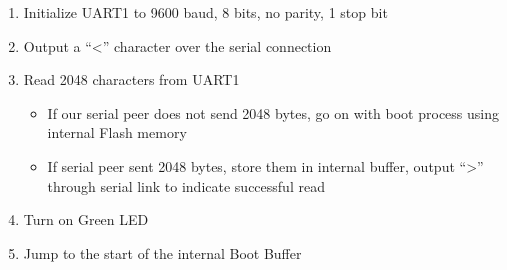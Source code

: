 \documentclass[conference]{IEEEtran}
\newcommand{\nota}[1]{}
\begin{document}
\nota{\begin{enumerate}
\item Se inicializa el UART1 a 9600 baudios, 8 bits, sin paridad, 1 bit de stop.
\item Se envía por esa conexión serie el caracter ``\textgreater''
\item Se leen desde el sistema embebido, 2048 bytes provenientes
de la conexión serie, y se almacenan en una buffer de inicio interno.
\item Decisión:
\begin{itemize}
\item Si el otro extremo de la conexión serie (por ejemplo, nuestra PC) no envía los 2048 bytes, el sistema continúa el proceso de arranque utilizando la memoria interna Flash.
\item Si el extremo de la conexión serie envió los 2048 bytes, entonces se envía desde el sistema (SOC) otro caracter ``\textgreater'' a través de la conexión serie, para indicar que 
se leyeron correctamente.
\end{itemize}
\item Finalmente, la CPU ``salta'' a la dirección del buffer de boot interno,
para continuar leyendo instrucciones desde
los 2048 bytes leídos.
\end{enumerate} } 

\begin{enumerate}
\item Initialize UART1 to 9600 baud, 8 bits, no parity, 1 stop bit
\item Output a ``\textless'' character over the serial connection
\item Read 2048 characters from UART1\nota{, store these in the internal Boot Buffer \nota{ (alias for the Ethernet Mac buffer)}}
\begin{itemize}
	\item If our serial peer does not send 2048 bytes, go on with boot process using internal Flash  memory
	\item If serial peer sent 2048 bytes, store them in internal buffer, output ``\textgreater'' through serial link to indicate successful read
\end{itemize}
\item Turn on Green LED
\item Jump to the start of the internal Boot Buffer
\end{enumerate}


\nota{En nuestras pruebas logramos obtener 
el caracter ``\textgreater'' desde el programa de comunicación minicom,
por lo que pudimos confirmar varias hipótesis. En principio
toda la conexión física entre la placa ENTC-1000 y nuestra PC era funcional.
También a nivel de comunicación vía software.}
\end{document}
